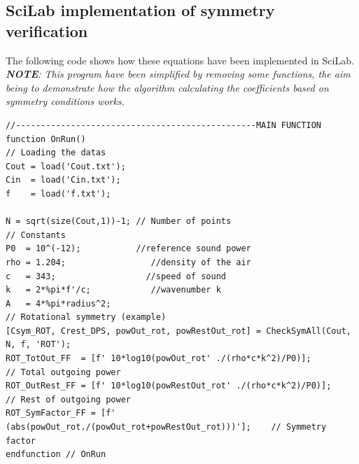 \documentclass{report}
\newcommand{\myequations}[1]{%
  \refstepcounter{myequations}%
  \addcontentsline{equ}{myequations}
    {\protect\numberline{\theequation}#1}\par%
}
\begin{document}
\begin{appendices}
%
%
%


\chapter{SciLab implementation of symmetry verification} 
\label{Chap:imple_sym}
The following code shows how these equations have been implemented in SciLab.\\
\textit{\textbf{NOTE}: This program have been simplified by removing some functions, the aim being to demonstrate how the algorithm calculating the coefficients based on symmetry conditions works.}

\lstset{language=SCilab} 
\begin{lstlisting}
//------------------------------------------------MAIN FUNCTION
function OnRun()
// Loading the datas
Cout = load('Cout.txt');
Cin  = load('Cin.txt');
f    = load('f.txt');

N = sqrt(size(Cout,1))-1; // Number of points
// Constants 
P0  = 10^(-12);		      //reference sound power
rho = 1.204;		         //density of the air
c   = 343;		            //speed of sound
k   = 2*%pi*f'/c;	         //wavenumber k
A   = 4*%pi*radius^2; 
// Rotational symmetry (example)
[Csym_ROT, Crest_DPS, powOut_rot, powRestOut_rot] = CheckSymAll(Cout, N, f, 'ROT');
ROT_TotOut_FF  = [f' 10*log10(powOut_rot' ./(rho*c*k^2)/P0)];        // Total outgoing power 
ROT_OutRest_FF = [f' 10*log10(powRestOut_rot' ./(rho*c*k^2)/P0)];    // Rest of outgoing power
ROT_SymFactor_FF = [f' (abs(powOut_rot./(powOut_rot+powRestOut_rot)))'];    // Symmetry factor
endfunction // OnRun


\end{lstlisting}
\end{appendices}
\end{document}

